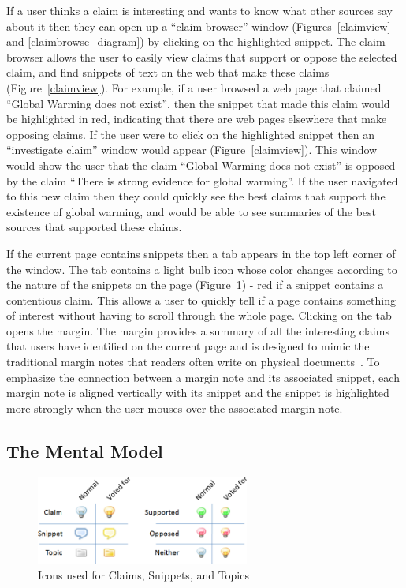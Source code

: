 \documentclass{chi2009}
\begin{document}
If a user thinks a claim is interesting and wants to know what other sources say about it then they can open up a ``claim browser'' window (Figures~\ref{claimview} and \ref{claimbrowse_diagram}) by clicking on the highlighted snippet. The claim browser allows the user to easily view claims that support or oppose the selected claim, and find snippets of text on the web that make these claims (Figure~\ref{claimview}). 
For example, if a user browsed a web page that claimed ``Global Warming does not exist'', then the snippet that made this claim would be highlighted in red, indicating that there are web pages elsewhere that make opposing claims. If the user were to click on the highlighted snippet then an ``investigate claim'' window would appear (Figure~\ref{claimview}). This window would show the user that the claim ``Global Warming does not exist'' is opposed by the claim ``There is strong evidence for global warming''. If the user navigated to this new claim then they could quickly see the best claims that support the existence of global warming, and would be able to see summaries of the best sources that supported these claims.


If the current page contains snippets then a tab appears in the top left corner of the window. The tab contains a light bulb icon whose color changes according to the nature of the snippets on the page (Figure~\ref{bookmark_icons}) - red if a snippet contains a contentious claim. This allows a user to quickly tell if a page contains something of interest without having to scroll through the whole page. Clicking on the tab opens the margin. The margin provides a summary of all the interesting claims that users have identified on the current page and is designed to mimic the traditional margin notes that readers often write on physical documents~\cite{marginalia}. To emphasize the connection between a margin note and its associated snippet, each margin note is aligned vertically with its snippet and the snippet is highlighted more strongly when the user mouses over the associated margin note. 

\subsection{The Mental Model}

\begin{figure}[tb]
	\begin{center}
	\includegraphics[width=7cm]{../screenshots/bookmark_icons2.png}
	\caption{Icons used for Claims, Snippets, and Topics}
	\label{bookmark_icons}
	\end{center}
\end{figure}
\end{document}
